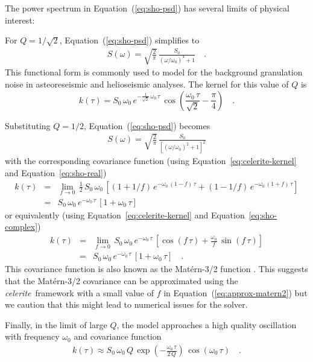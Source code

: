 \documentclass[manuscript, letterpaper]{aastex6}
\newcommand{\celeriteterm}{\emph{celerite}}
\renewcommand{\eqref}[1]{\ref{eq:#1}}
\newcommand{\Eq}[1]{Equation~(\eqref{#1})}
\newcommand{\eq}[1]{\Eq{#1}}
\newcommand{\eqalt}[1]{Equation~\eqref{#1}}
\newcommand{\eqlabel}[1]{\label{eq:#1}}
\begin{document}
The power spectrum in \eq{sho-psd} has several limits of physical interest:
\begin{itemize}

{\item For $Q = 1/\sqrt{2}$, \eq{sho-psd} simplifies to
\begin{eqnarray}\eqlabel{granulation-psd}
S(\omega) = \sqrt{\frac{2}{\pi}}\,\frac{S_0}{(\omega/\omega_0)^4+1} \quad.
\end{eqnarray}
This functional form is commonly used to model for the background granulation
noise in asteoreseismic and helioseismic \citep{Harvey:1985, Michel:2009,
Kallinger:2014}  analyses.
The kernel for this value of $Q$ is
\begin{equation}
k(\tau) = S_0\,\omega_0\,e^{-\frac{1}{\sqrt{2}}\,\omega_0\,\tau}\,
    \cos{\left(\frac{\omega_0\,\tau}{\sqrt{2}}-\frac{\pi}{4}\right)} \quad.
\end{equation}}

{\item Substituting $Q = 1/2$, \eq{sho-psd} becomes
\begin{eqnarray}
S(\omega) =
    \sqrt{\frac{2}{\pi}}\,\frac{S_0}{\left[(\omega/\omega_0)^2+1\right]^2}
\end{eqnarray}
with the corresponding covariance function (using
\eqalt{celerite-kernel} and \eqalt{sho-real})
\begin{eqnarray}\eqlabel{approx-matern}
k(\tau) &=& \lim_{f \to 0}\,
    \frac{1}{2}\,S_0\,\omega_0\,
    \left[\left(1+1/f\right)\,e^{-\omega_0\,(1-f)\,\tau} +
          \left(1-1/f\right)\,e^{-\omega_0\,(1+f)\,\tau}
    \right] \\
&=& S_0\,\omega_0\,e^{-\omega_0\,\tau}\,[1+\omega_0\,\tau]
\end{eqnarray}
or equivalently (using \eqalt{celerite-kernel} and \eqalt{sho-complex})
\begin{eqnarray}\eqlabel{approx-matern2}
k(\tau) &=& \lim_{f \to 0}\,
    S_0\,\omega_0\,e^{-\omega_0\,\tau}\,
    \left[\cos(f\,\tau) + \frac{\omega_0}{f}\,\sin(f\,\tau)\right] \\
&=& S_0\,\omega_0\,e^{-\omega_0\,\tau}\,[1+\omega_0\,\tau] \quad.
\end{eqnarray}
This covariance function is also known as the Mat\'ern-3/2 function
\citep{Rasmussen:2006}.
This suggests that the Mat\'ern-3/2 covariance can be approximated using
the \celeriteterm\ framework with a small value of $f$ in \eq{approx-matern2} but we
caution that this might lead to numerical issues for the solver.
}

{\item Finally, in the limit of large $Q$, the model approaches a high
    quality oscillation with frequency $\omega_0$ and covariance function
\begin{eqnarray}
k(\tau) \approx
    S_0\,\omega_0\,Q\,
    \exp\left(-\frac{\omega_0\,\tau}{2\,Q}\right)\,
    \cos\left(\omega_0\,\tau\right) \quad.
\end{eqnarray}}

\end{itemize}
\end{document}
